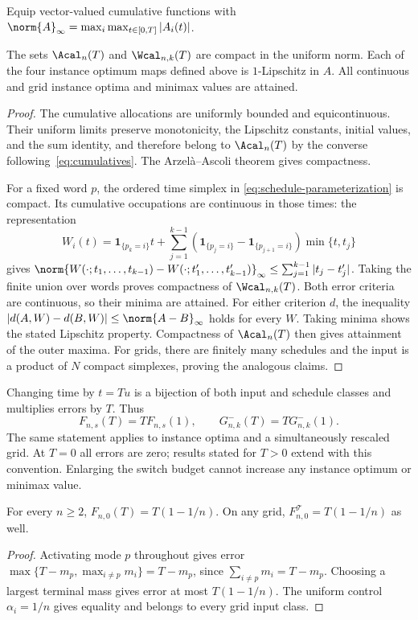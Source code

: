 Equip vector-valued cumulative functions with
$\norm{A}_\infty=\max_i\max_{t\in[0,T]}|A_i(t)|$.
\begin{proposition}\label{prop:compactness}
The sets $\Acal_n(T)$ and $\Wcal_{n,k}(T)$ are compact in the uniform norm.
Each of the four instance optimum maps defined above is $1$-Lipschitz in
$A$. All continuous and grid instance optima and minimax values are attained.
\end{proposition}
\begin{proof}
The cumulative allocations are uniformly bounded and equicontinuous. Their
uniform limits preserve monotonicity, the Lipschitz constants, initial values,
and the sum identity, and therefore belong to $\Acal_n(T)$ by the converse
following~\eqref{eq:cumulatives}. The Arzel\`a--Ascoli theorem gives compactness.

For a fixed word $p$, the ordered time simplex in
\eqref{eq:schedule-parameterization} is compact. Its cumulative occupations
are continuous in those times: the representation
\[
 W_i(t)=\mathbf1_{\{p_k=i\}}t+
 \sum_{j=1}^{k-1}
 (\mathbf1_{\{p_j=i\}}-\mathbf1_{\{p_{j+1}=i\}})\min\{t,t_j\}
\]
gives
$\norm{W(\cdot;t_1,\ldots,t_{k-1})-
W(\cdot;t'_1,\ldots,t'_{k-1})}_\infty
\le\sum_{j=1}^{k-1}|t_j-t'_j|$.
Taking the finite union over words proves compactness of
$\Wcal_{n,k}(T)$. Both error criteria are continuous, so their minima are
attained. For either criterion $d$, the inequality
$|d(A,W)-d(B,W)|\le\norm{A-B}_\infty$ holds for every $W$. Taking minima
shows the stated Lipschitz property. Compactness of $\Acal_n(T)$ then gives
attainment of the outer maxima. For grids, there are finitely many schedules
and the input is a product of $N$ compact simplexes, proving the analogous
claims.
\end{proof}

Changing time by $t=Tu$ is a bijection of both input and schedule classes and
multiplies errors by $T$. Thus
\begin{equation}\label{eq:scaling}
 F_{n,s}(T)=T F_{n,s}(1),\qquad G^-_{n,k}(T)=T G^-_{n,k}(1).
\end{equation}
The same statement applies to instance optima and a simultaneously rescaled
grid. At $T=0$ all errors are zero; results stated for $T>0$ extend with this
convention. Enlarging the switch budget cannot increase any instance optimum
or minimax value.

\begin{proposition}\label{prop:no-switch}
For every $n\ge2$,
$F_{n,0}(T)=T(1-1/n)$. On any grid,
$F^{\mathcal T}_{n,0}=T(1-1/n)$ as well.
\end{proposition}
\begin{proof}
Activating mode $p$ throughout gives error
$\max\{T-m_p,\max_{i\ne p}m_i\}=T-m_p$, since
$\sum_{i\ne p}m_i=T-m_p$. Choosing a largest terminal mass gives error at
most $T(1-1/n)$. The uniform control $\alpha_i=1/n$ gives equality and
belongs to every grid input class.
\end{proof}
